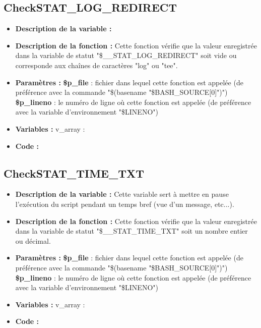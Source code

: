 \documentclass[a4paper,10pt]{article}
\begin{document}
\color{green}
\subsection{CheckSTAT\_LOG\_REDIRECT}\color{white}
\begin{itemize}
    \item \textbf{Description de la variable :}

    \item \textbf{Description de la fonction :} Cette fonction vérifie que la valeur enregistrée dans la variable de statut "\$\_\_STAT\_LOG\_REDIRECT" soit vide ou corresponde aux chaînes de caractères "log" ou "tee".

    \item \textbf{Paramètres :}
        \color{orange}\textbf{\$p\_file}\color{white} : fichier dans lequel cette fonction est appelée (de préférence avec la commande "\$(\color{gray}basename \color{white}"\color{orange}\$BASH\_SOURCE[0]\color{white}")")
    \color{orange}\textbf{\$p\_lineno}\color{white} : le numéro de ligne où cette fonction est appelée (de préférence avec la variable d'environnement "\color{orange}\$LINENO\color{white}")

    \item \textbf{Variables :} v\_array :

    \item \textbf{Code :}
\end{itemize}

\color{green}
\subsection{CheckSTAT\_TIME\_TXT}\color{white}
\begin{itemize}
    \item \textbf{Description de la variable :} Cette variable sert à mettre en pause l'exécution du script pendant un temps bref (vue d'un message, etc...).

    \item \textbf{Description de la fonction :} Cette fonction vérifie que la valeur enregistrée dans la variable de statut "\$\_\_STAT\_TIME\_TXT" soit un nombre entier ou décimal.

    \item \textbf{Paramètres :}
        \color{orange}\textbf{\$p\_file}\color{white} : fichier dans lequel cette fonction est appelée (de préférence avec la commande "\$(\color{gray}basename \color{white}"\color{orange}\$BASH\_SOURCE[0]\color{white}")")
    \color{orange}\textbf{\$p\_lineno}\color{white} : le numéro de ligne où cette fonction est appelée (de préférence avec la variable d'environnement "\color{orange}\$LINENO\color{white}")

    \item \textbf{Variables :} v\_array :

    \item \textbf{Code :}
\end{itemize}
\end{document}
